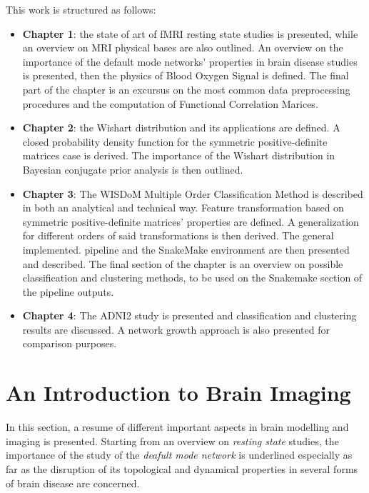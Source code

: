 \documentclass[12pt,openright,twoside,a4paper]{book}
\begin{document}
This work is structured as follows:
\begin{itemize}
\item \textbf{Chapter 1}: the state of art of fMRI resting state studies is presented, while an overview on MRI physical bases are also outlined.
An overview on the importance of the default mode networks' properties in brain disease studies is presented, then the physics of Blood Oxygen Signal is defined.
The final part of the chapter is an excursus on the most common data preprocessing procedures and the computation of Functional Correlation Marices.

\item \textbf{Chapter 2}: the Wishart distribution and its applications are defined.
A closed probability density function for the symmetric positive-definite matrices case is derived.
The importance of the Wishart distribution in Bayesian conjugate prior analysis is then outlined.

\item \textbf{Chapter 3}: The WISDoM Multiple Order Classification Method is described in both an analytical and technical way.
Feature transformation based on symmetric positive-definite matrices' properties are defined.
A generalization for different orders of said transformations is then derived.
The general implemented. pipeline and the SnakeMake environment are then presented and described.
The final section of the chapter is an overview on possible classification and clustering methods, to be used on the Snakemake section of the pipeline outputs.

\item \textbf{Chapter 4}: The ADNI2 study is presented and classification and clustering results are discussed. A network growth approach is also presented for comparison purposes.
\end{itemize}

\mainmatter

\chapter{An Introduction to Brain Imaging}

In this section, a resume of different important aspects in brain modelling and imaging is presented.
Starting from an overview on \textit{resting state} studies, the importance of the study of the \textit{deafult mode network} is underlined especially as far as the disruption of its topological and dynamical properties in several forms of brain disease are concerned.
\end{document}

